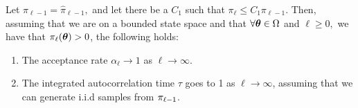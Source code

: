 \begin{proposition}
	Let $\pi_{\ell-1}=\hat{\pi}_{\ell-1},$ and  let there be a $C_1$ such that $\pi_\ell\leq C_1\pi_{\ell-1}$. Then, assuming that we are on a bounded state space and that $\forall \bm{\theta}\in\Omega$ and $ \ell\geq0, $ we have that $\pi_\ell(\bm{\theta})>0$, the following holds: \begin{enumerate}
		\item The acceptance rate $\alpha_\ell\rightarrow 1$ as $\ell\rightarrow\infty$. 
		\item The integrated autocorrelation time $\tau$ goes to 1  as $\ell\rightarrow\infty$, assuming that we can generate i.i.d samples from $\pi_{\ell-1}$.
	\end{enumerate}

\end{proposition}
